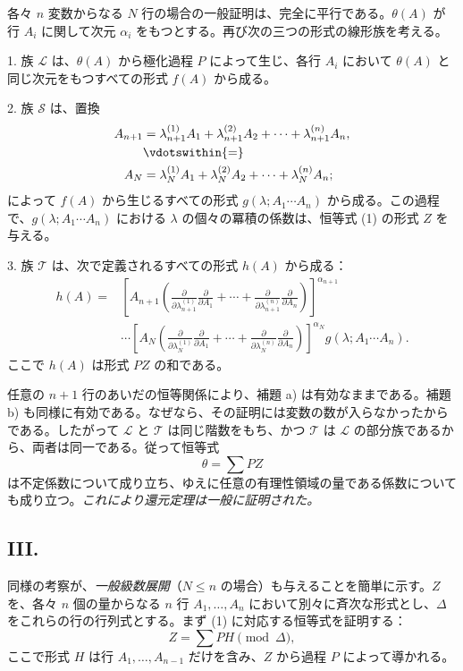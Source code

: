 \documentclass[11pt]{article}
\begin{document}
各々 $n$ 変数からなる $N$ 行の場合の一般証明は、完全に平行である。$\theta(A)$ が行 $A_i$ に関して次元 $\alpha_i$ をもつとする。再び次の三つの形式の線形族を考える。

1. 族 $\mathcal L$ は、$\theta(A)$ から極化過程 $P$ によって生じ、各行 $A_i$ において $\theta(A)$ と同じ次元をもつすべての形式 $f(A)$ から成る。

2. 族 $\mathcal S$ は、置換
\[
\begin{aligned}
 A_{n+1}&=\lambda_{n+1}^{(1)}A_1+\lambda_{n+1}^{(2)}A_2+
        \cdots+\lambda_{n+1}^{(n)}A_n,\\
 &\vdotswithin{=}\\
 A_N&=\lambda_N^{(1)}A_1+\lambda_N^{(2)}A_2+
        \cdots+\lambda_N^{(n)}A_n;
\end{aligned}
\]
によって $f(A)$ から生じるすべての形式 $g(\lambda;A_1\cdots A_n)$ から成る。この過程で、$g(\lambda;A_1\cdots A_n)$ における $\lambda$ の個々の冪積の係数は、恒等式 (1) の形式 $Z$ を与える。

3. 族 $\mathcal T$ は、次で定義されるすべての形式 $h(A)$ から成る：
\[
\begin{aligned}
 h(A)=&\left[A_{n+1}\left(
 \frac{\partial}{\partial\lambda_{n+1}^{(1)}}\frac{\partial}{\partial A_1}
 +\cdots+
 \frac{\partial}{\partial\lambda_{n+1}^{(n)}}\frac{\partial}{\partial A_n}\right)\right]^{\alpha_{n+1}} \\
&\cdots
\left[A_N\left(
 \frac{\partial}{\partial\lambda_N^{(1)}}\frac{\partial}{\partial A_1}
 +\cdots+
 \frac{\partial}{\partial\lambda_N^{(n)}}\frac{\partial}{\partial A_n}\right)\right]^{\alpha_N}
 g(\lambda;A_1\cdots A_n).
\end{aligned}
\]
ここで $h(A)$ は形式 $PZ$ の和である。

任意の $n+1$ 行のあいだの恒等関係により、補題 a) は有効なままである。補題 b) も同様に有効である。なぜなら、その証明には変数の数が入らなかったからである。したがって $\mathcal L$ と $\mathcal T$ は同じ階数をもち、かつ $\mathcal T$ は $\mathcal L$ の部分族であるから、両者は同一である。従って恒等式
\[
  \theta=\sum PZ
\]
は不定係数について成り立ち、ゆえに任意の有理性領域の量である係数についても成り立つ。\emph{これにより還元定理は一般に証明された。}

\subsection*{III.}
同様の考察が、\emph{一般級数展開}（$N\le n$ の場合）も与えることを簡単に示す。$Z$ を、各々 $n$ 個の量からなる $n$ 行 $A_1,
\ldots,A_n$ において別々に斉次な形式とし、$\Delta$ をこれらの行の行列式とする。まず (1) に対応する恒等式を証明する：
\begin{equation}
  Z=\sum PH \pmod{\Delta},
\tag{2}
\end{equation}
ここで形式 $H$ は行 $A_1,
\ldots,A_{n-1}$ だけを含み、$Z$ から過程 $P$ によって導かれる。
\end{document}

